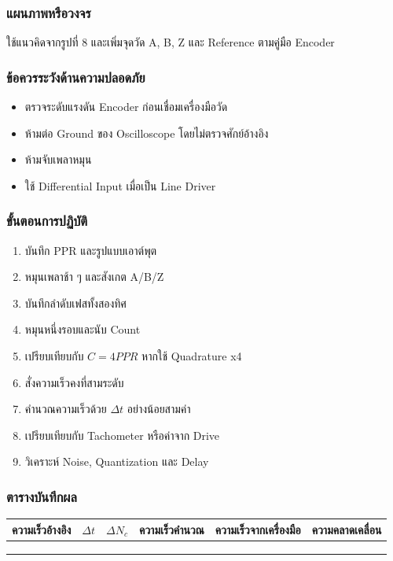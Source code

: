\subsubsection{แผนภาพหรือวงจร}

ใช้แนวคิดจากรูปที่ 8 และเพิ่มจุดวัด A, B, Z และ Reference ตามคู่มือ Encoder

\subsubsection{ข้อควรระวังด้านความปลอดภัย}

\begin{itemize}
    \item ตรวจระดับแรงดัน Encoder ก่อนเชื่อมเครื่องมือวัด
    \item ห้ามต่อ Ground ของ Oscilloscope โดยไม่ตรวจศักย์อ้างอิง
    \item ห้ามจับเพลาหมุน
    \item ใช้ Differential Input เมื่อเป็น Line Driver
\end{itemize}

\subsubsection{ขั้นตอนการปฏิบัติ}

\begin{enumerate}
    \item บันทึก PPR และรูปแบบเอาต์พุต
    \item หมุนเพลาช้า ๆ และสังเกต A/B/Z
    \item บันทึกลำดับเฟสทั้งสองทิศ
    \item หมุนหนึ่งรอบและนับ Count
    \item เปรียบเทียบกับ $C=4PPR$ หากใช้ Quadrature x4
    \item สั่งความเร็วคงที่สามระดับ
    \item คำนวณความเร็วด้วย $\Delta t$ อย่างน้อยสามค่า
    \item เปรียบเทียบกับ Tachometer หรือค่าจาก Drive
    \item วิเคราะห์ Noise, Quantization และ Delay
\end{enumerate}

\subsubsection{ตารางบันทึกผล}

\begin{table}[htbp]
    \centering
    \begin{tabular}{r r r r r r}
        \hline
        \textbf{ความเร็วอ้างอิง} & \textbf{$\Delta t$} & \textbf{$\Delta N_c$} & \textbf{ความเร็วคำนวณ} & \textbf{ความเร็วจากเครื่องมือ} & \textbf{ความคลาดเคลื่อน} \\
        \hline
         &  &  &  &  &  \\
         &  &  &  &  &  \\
         &  &  &  &  &  \\
        \hline
    \end{tabular}
\end{table}

